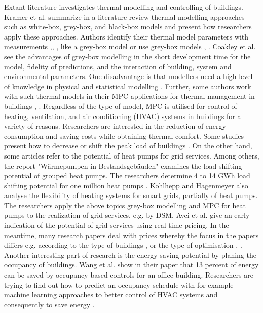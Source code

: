     Extant literature investigates thermal modelling and controlling of buildings. Kramer et al. \cite{Kramer.2012} summarize in a literature review thermal modelling approaches such as white-box, grey-box, and black-box models and present how researchers apply these approaches. Authors identify their thermal model parameters with measurements \cite{Siroky.2011},\cite{Hazyuk.2012}, \cite{Park.2011}, like a grey-box model or use grey-box models \cite{Freund.2020}, \cite{EvelynSperber.2019}. Coakley et al. \cite{Coakley.2014} see the advantages of grey-box modelling in the short development time for the model, fidelity of predictions, and the interaction of building, system and environmental parameters. One disadvantage is that modellers need a high level of knowledge in physical and statistical modelling \cite{Coakley.2014}. Further, some authors work with such thermal models in their MPC applications for thermal management in buildings \cite{JiriCigler.}, \cite{Hazyuk.2012b}. 
    \newline
    Regardless of the type of model, MPC is utilised for control of heating, ventilation, and air conditioning (HVAC)  systems in buildings for a variety of reasons. Researchers are interested in the reduction of energy consumption \cite{Hazyuk.2012b} and saving costs \cite{Zwickel.2019} while obtaining thermal comfort. Some studies present how to decrease or shift the peak load of buildings \cite{Oldewurtel.2010}.
    \newline
    On the other hand, some articles refer to the potential of heat pumps for grid services. Among others, the report "Wärmepumpen in Bestandsgebäuden" examines the load shifting potential of grouped heat pumps. The researchers determine 4 to 14 GWh load shifting potential for one million heat pumps \cite{WPimBestand.2020}.
    Kohlhepp and Hagenmeyer \cite{Kohlhepp.2017} also analyse the flexibility of heating systems for smart grids, partially of heat pumps. 
    \newline
    The researchers apply the above topics grey-box modelling and MPC for heat pumps to the realization of grid services, e.g. by DSM. Avci et al. \cite{Avci.2013} give an early indication of the potential of grid services using real-time pricing. In the meantime, many research papers deal with prices whereby the focus in the papers differs e.g. according to the type of buildings \cite{Bianchini.2019}, \cite{Kim.2018} or the type of optimisation \cite{Bianchini.2019}, \cite{Bianchini.2016}.\newline 
    Another interesting part of research is the energy saving potential by planing the occupancy of buildings. Wang et al. \cite{Wang.2019} show in their paper that 13 percent of energy can be saved by occupancy-based controls for an office building. Researchers are trying to find out how to predict an occupancy schedule with for example machine learning approaches to better control of HVAC systems and consequently to save energy \cite{Liang.2016}.\newline
    
